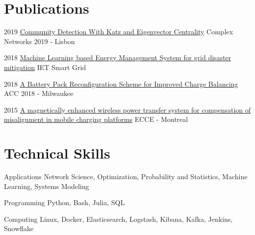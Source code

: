 \documentclass{tccv}
\begin{document}
\vspace{-15pt}
\section{Publications}
\begin{yearlist}
	\item{2019}
	{\href{https://github.com/markditsworth/CompleNet2019/blob/master/Presentation.pdf}{Community Detection With Katz and Eigenvector Centrality}}
	{Complex Networks 2019 - Lisbon}
	
	\item{2018}
	{\href{https://digital-library.theiet.org/content/journals/10.1049/iet-stg.2018.0043}{Machine Learning based Energy Management System for grid disaster mitigation}}
	{IET Smart Grid}
	
	\item{2018}
	{\href{https://ieeexplore.ieee.org/document/8431612}{A Battery Pack Reconfiguration Scheme for Improved Charge Balancing}}
	{ACC 2018 - Milwaukee}
	
	\item{2015}
	{\href{http://ieeexplore.ieee.org/document/7309840/}{A magnetically enhanced wireless power transfer system for compensation of misalignment in mobile charging platforms}}
	{ECCE - Montreal}
	
\end{yearlist}

\section{Technical Skills}
\begin{factlist}
\item {Applications}
	{Network Science, Optimization, Probability and Statistics, Machine Learning, Systems Modeling}

\item{Programming}
    {Python, Bash, Julia, SQL}
    
\item{Computing}
     {Linux, Docker, Elasticsearch, Logstash, Kibana, Kafka, Jenkins, Snowflake}



\end{factlist}
\end{document}
